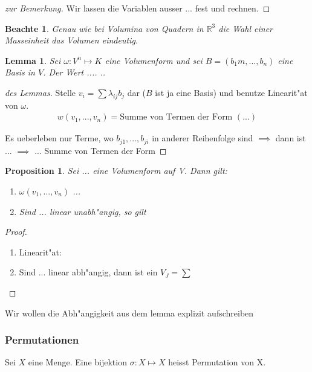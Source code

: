 \documentclass[11pt]{article}
\newtheorem*{notte}{Beachte}
\newtheorem*{proposition}{Proposition}
\newtheorem*{lemma}{Lemma}
\begin{document}
\begin{proof}[zur Bemerkung]
  Wir lassen die Variablen ausser ... fest und rechnen.
\end{proof}

\begin{notte}
  Genau wie bei Volumina von Quadern in $\mathbb{R}^3$ die Wahl einer
  Masseinheit das Volumen eindeutig.
\end{notte}

\begin{lemma}
  Sei $\omega: V^n\mapsto K$ eine Volumenform und sei $B=(b_1m, ... , b_n)$
  eine Basis in $V$. Der Wert ....  ..
\end{lemma}

\begin{proof}[des Lemmas]
  Stelle $v_i=\sum{\lambda_{ij}b_j}$ dar ($B$ ist ja eine Basis) und benutze
  Linearit"at von $\omega$.
  \begin{align*}
    w(v_1, ..., v_n)=\text{Summe von Termen der Form } (...)
  \end{align*}

  Es ueberleben nur Terme, wo $b_{j1},...,b_{ji}$ in anderer Reihenfolge sind
  $\implies$ dann ist ... $\implies$ ... Summe von Termen der Form
\end{proof}
\begin{proposition}
  Sei ... eine Volumenform auf V. Dann gilt:
  \begin{enumerate}
  \item $\omega(v_1,...,v_n)$ ...
  \item Sind ... linear unabh"angig, so gilt
  \end{enumerate}
\end{proposition}

\begin{proof}
  \begin{enumerate}
  \item Linearit"at: 
  \item Sind ... linear abh"angig, dann ist ein $V_J=\sum$
  \end{enumerate}
\end{proof}

Wir wollen die Abh"angigkeit aus dem lemma explizit aufschreiben

\subsubsection{Permutationen}
\label{sec:perm}

\begin{definition}
  Sei $X$ eine Menge. Eine bijektion $\sigma: X \mapsto X$ heisst Permutation
  von X.
\end{definition}
\end{document}
